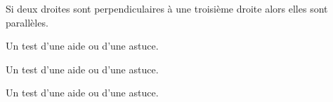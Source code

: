 \documentclass[a4paper,12pt]{report}
\begin{document}
\begin{propriete}[Test]
Si deux droites sont perpendiculaires à une troisième droite alors elles sont parallèles.
\end{propriete}

\begin{boiteicone}[colorTer][À savoir][\faHeart]
  Un test d'une aide ou d'une astuce.
\end{boiteicone}

\begin{boiteicone}[colorTer][Exemple][\faMedapps]
  Un test d'une aide ou d'une astuce.
  \vspace{6cm}
\end{boiteicone}
\begin{boiteicone}[colorTer][Exercice][\faEdit]
  Un test d'une aide ou d'une astuce.
\end{boiteicone}
\end{document}
